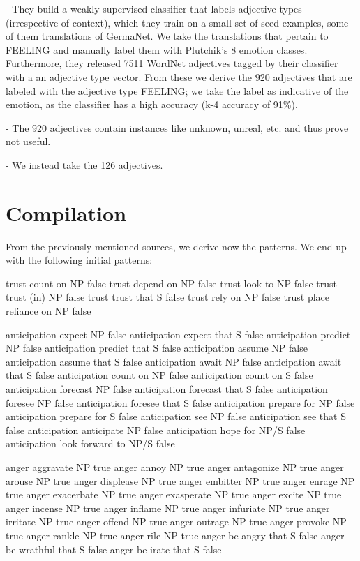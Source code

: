 - They build a weakly supervised classifier that labels adjective types (irrespective of context), which they train on a small set of seed examples, some of them translations of GermaNet. We take the translations that pertain to FEELING and manually label them with Plutchik's 8 emotion classes. Furthermore, they released 7511 WordNet adjectives tagged by their classifier with a an adjective type vector. From these we derive the 920 adjectives that are labeled with the adjective type FEELING; we take the label as indicative of the emotion, as the classifier has a high accuracy (k-4 accuracy of 91\%).

- The 920 adjectives contain instances like unknown, unreal, etc. and thus prove not useful.

- We instead take the 126 adjectives. 


\section{Compilation}

From the previously mentioned sources, we derive now the patterns. We end up with the following initial patterns:

trust	count on	NP	false
trust	depend on	NP	false
trust	look to	NP	false
trust	trust (in)	NP	false
trust	trust that	S	false
trust	rely on	NP	false
trust	place reliance on	NP	false

anticipation	expect	NP	false
anticipation	expect that	S	false
anticipation	predict	NP	false
anticipation	predict that	S	false
anticipation	assume NP	false
anticipation	assume that	S	false
anticipation	await	NP	false
anticipation	await	that S	false
anticipation	count on	NP	false
anticipation	count on	S	false
anticipation	forecast	NP	false
anticipation	forecast that S	false
anticipation	foresee	NP	false
anticipation	foresee that	S	false
anticipation	prepare for	NP	false
anticipation	prepare for	S	false
anticipation	see	NP	false
anticipation	see that	S	false
anticipation	anticipate	NP	false
anticipation	hope for	NP/S	false
anticipation	look forward to	NP/S	false


anger	aggravate	NP	true
anger	annoy	NP	true
anger	antagonize	NP	true
anger	arouse	NP	true
anger	displease	NP	true
anger	embitter	NP	true
anger	enrage	NP	true
anger	exacerbate	NP	true
anger	exasperate	NP	true
anger	excite	NP	true
anger	incense	NP	true
anger	inflame	NP	true
anger	infuriate	NP	true
anger	irritate		NP	true
anger	offend	NP	true
anger	outrage	NP	true
anger	provoke	NP	true
anger	rankle	NP	true
anger	rile	NP	true
anger	be angry that	S	false
anger	be wrathful that	S	false
anger	be irate that	S	false

